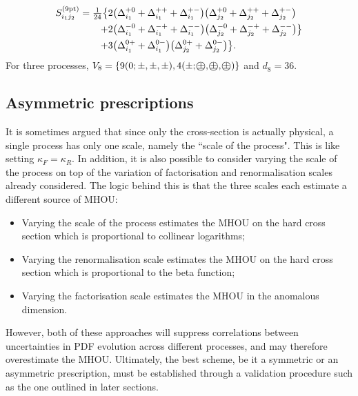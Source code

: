 \begin{itemize}
\begin{equation}
\begin{split}
    S^{(\rm 9pt)}_{i_1j_2} =
    \hbox{${{1}\over {24}}$}\big\{&2\big(\Delta_{i_1}^{+0}+\Delta_{i_1}^{++}
    + \Delta_{i_1}^{+-}\big) \big(\Delta_{j_2}^{+0} +
    \Delta_{j_2}^{++} + \Delta_{j_2}^{+-} \big) \\ 
            + &2\big(\Delta_{i_1}^{-0} + \Delta_{i_1}^{-+} +
            \Delta_{i_1}^{--}\big)\big(\Delta_{j_2}^{-0} +
            \Delta_{j_2}^{-+} + \Delta_{j_2}^{--} \big) \big\}\\ 
            + &3\big(\Delta_{i_1}^{0+}+ \Delta_{i_1}^{0-}\big)\big(\Delta_{j_2}^{0+} + \Delta_{j_2}^{0-} \big)\big\}.
\end{split}            
\end{equation}
For three processes, $V_8= \{9(0;\pm,\pm,\pm),
4(\pm;\pmz,\pmz,\pmz)\}$ and $d_8=36$.
\end{itemize}
\subsection{Asymmetric prescriptions}
It is sometimes argued that since only the cross-section is actually physical, a single process has only one scale, namely the ``scale of the process". This is like setting $\kappa_F = \kappa_R$. In addition, it is also possible to consider varying the scale of the process on top of the variation of factorisation and renormalisation scales already considered. The logic behind this is that the three scales each estimate a different source of MHOU:
\begin{itemize}
\item Varying the scale of the process estimates the MHOU on the hard cross section which is proportional to collinear logarithms;
\item Varying the renormalisation scale estimates the MHOU on the hard cross section which is proportional to the beta function;
\item Varying the factorisation scale estimates the MHOU in the anomalous dimension.
\end{itemize}
However, both of these approaches will suppress correlations between uncertainties in PDF evolution across different processes, and may therefore overestimate the MHOU. Ultimately, the best scheme, be it a symmetric or an asymmetric prescription, must be established through a validation procedure such as the one outlined in later sections.

